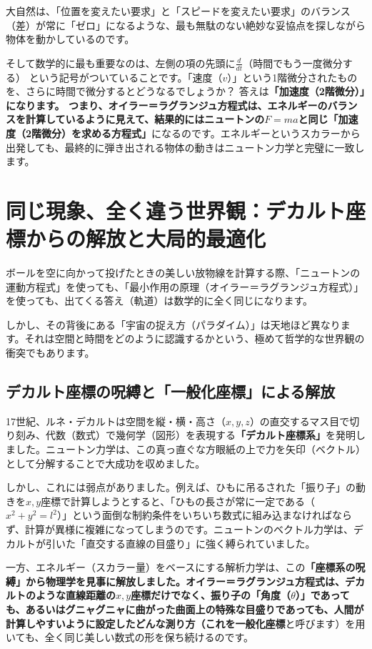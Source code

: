 大自然は、「位置を変えたい要求」と「スピードを変えたい要求」のバランス（差）が常に「ゼロ」になるような、最も無駄のない絶妙な妥協点を探しながら物体を動かしているのです。

そして数学的に最も重要なのは、左側の項の先頭に\(\frac{d}{dt}\)（時間でもう一度微分する） という記号がついていることです。「速度（\(v\)）」という1階微分されたものを、さらに時間で微分するとどうなるでしょうか？ 答えは\textbf{「加速度（2階微分）」になります。 つまり、オイラー＝ラグランジュ方程式は、エネルギーのバランスを計算しているように見えて、結果的にはニュートンの\(F=ma\)と同じ「加速度（2階微分）を求める方程式」}になるのです。エネルギーというスカラーから出発しても、最終的に弾き出される物体の動きはニュートン力学と完璧に一致します。

\section{同じ現象、全く違う世界観：デカルト座標からの解放と大局的最適化}

ボールを空に向かって投げたときの美しい放物線を計算する際、「ニュートンの運動方程式」を使っても、「最小作用の原理（オイラー＝ラグランジュ方程式）」を使っても、出てくる答え（軌道）は数学的に全く同じになります。

しかし、その背後にある「宇宙の捉え方（パラダイム）」は天地ほど異なります。それは空間と時間をどのように認識するかという、極めて哲学的な世界観の衝突でもあります。

\subsection{デカルト座標の呪縛と「一般化座標」による解放}

17世紀、ルネ・デカルトは空間を縦・横・高さ（\(x,y,z\)）の直交するマス目で切り刻み、代数（数式）で幾何学（図形）を表現する\textbf{「デカルト座標系」}を発明しました。ニュートン力学は、この真っ直ぐな方眼紙の上で力を矢印（ベクトル）として分解することで大成功を収めました。

しかし、これには弱点がありました。例えば、ひもに吊るされた「振り子」の動きを\(x,y\)座標で計算しようとすると、「ひもの長さが常に一定である（\(x^2+y^2=l^2\)）」という面倒な制約条件をいちいち数式に組み込まなければならず、計算が異様に複雑になってしまうのです。ニュートンのベクトル力学は、デカルトが引いた「直交する直線の目盛り」に強く縛られていました。

一方、エネルギー（スカラー量）をベースにする解析力学は、この\textbf{「座標系の呪縛」から物理学を見事に解放しました。オイラー＝ラグランジュ方程式は、デカルトのような直線距離の\(x,y\)座標だけでなく、振り子の「角度（\(\theta\)）」であっても、あるいはグニャグニャに曲がった曲面上の特殊な目盛りであっても、人間が計算しやすいように設定したどんな測り方（これを一般化座標}と呼びます）を用いても、全く同じ美しい数式の形を保ち続けるのです。

